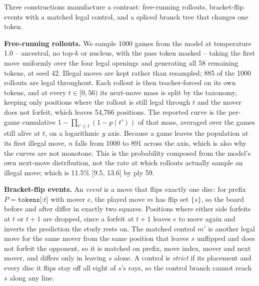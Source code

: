 \documentclass{article}
\begin{document}
Three constructions manufacture a contrast: free-running rollouts, bracket-flip events with a
matched legal control, and a spliced branch tree that changes one token.

\textbf{Free-running rollouts.} We sample 1000 games from the model at temperature 1.0 --
ancestral, no top-$k$ or nucleus, with the pass token masked -- taking the first move uniformly
over the four legal openings and generating all 58 remaining tokens, at seed 42. Illegal moves
are kept rather than resampled; 885 of the 1000 rollouts are legal throughout. Each rollout is
then teacher-forced on its own tokens, and at every $t \in [0, 56)$ its next-move mass is split
by the taxonomy, keeping only positions where the rollout is still legal through $t$ and the
mover does not forfeit, which leaves 54,766 positions. The reported curve is the per-game
cumulative $1 - \prod_{t' \le t}(1 - p(t'))$ of that mass, averaged over the games still alive at
$t$, on a logarithmic $y$ axis. Because a game leaves the population at its first illegal move,
$n$ falls from 1000 to 891 across the axis, which is also why the curves are not monotone. This
is the probability composed from the model's own next-move distribution, not the rate at which
rollouts actually sample an illegal move; which is 11.5\% [9.5, 13.6] by ply 59.

\textbf{Bracket-flip events.} An \emph{event} is a move that flips exactly one disc: for prefix
$P = \texttt{tokens[:}t \texttt{]}$ with mover $e$, the played move $m$ has flip set $\{s\}$, so
the board before and after differ in exactly two squares. Positions where either side forfeits at
$t$ or $t+1$ are dropped, since a forfeit at $t+1$ leaves $e$ to move again and inverts the
prediction the study rests on. The matched control $m'$ is another legal move for the same mover
from the same position that leaves $s$ unflipped and does not forfeit the opponent, so it is
matched on prefix, move index, mover and next mover, and differs only in leaving $s$ alone. A
control is \emph{strict} if its placement and every disc it flips stay off all eight of $s$'s
rays, so the control branch cannot reach $s$ along any line.
\end{document}

